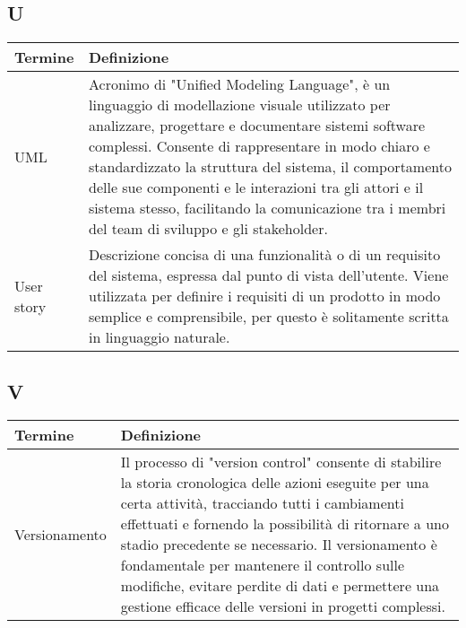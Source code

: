 \documentclass[10pt]{article}
\begin{document}
\subsection{U} %
\begin{longtable}{|>{\centering\arraybackslash}m{2.5cm}|>{\arraybackslash}m{12.5cm}|}
\hline
\rowcolor[gray]{0.8}
\textbf{Termine} & \textbf{Definizione}\\
\endhead
\hline
UML & Acronimo di "Unified Modeling Language", è un linguaggio di modellazione visuale utilizzato per analizzare, progettare e documentare sistemi software complessi. Consente di rappresentare in modo chiaro e standardizzato la struttura del sistema, il comportamento delle sue componenti e le interazioni tra gli attori e il sistema stesso, facilitando la comunicazione tra i membri del team di sviluppo e gli stakeholder.\\
\hline
User story & Descrizione concisa di una funzionalità o di un requisito del sistema, espressa dal punto di vista dell'utente. Viene utilizzata per definire i requisiti di un prodotto in modo semplice e comprensibile, per questo è solitamente scritta in linguaggio naturale.\\
\hline
\end{longtable}

\subsection{V} %
\begin{longtable}{|>{\centering\arraybackslash}m{2.5cm}|>{\arraybackslash}m{12.5cm}|}
\hline
\rowcolor[gray]{0.8}
\textbf{Termine} & \textbf{Definizione}\\
\endhead
\hline
Versionamento & Il processo di "version control" consente di stabilire la storia cronologica delle azioni eseguite per una certa attività, tracciando tutti i cambiamenti effettuati e fornendo la possibilità di ritornare a uno stadio precedente se necessario. Il versionamento è fondamentale per mantenere il controllo sulle modifiche, evitare perdite di dati e permettere una gestione efficace delle versioni in progetti complessi.\\
\hline
\end{longtable}
\end{document}
